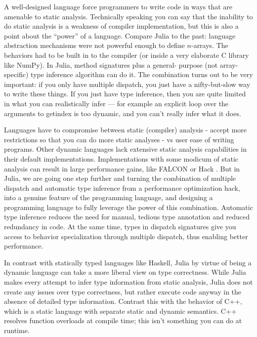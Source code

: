 \documentclass[preprint]{sigplanconf}
\begin{document}
A well-designed language force programmers to write code in ways that are
amenable to static analysis. Technically speaking you can say that the
inability to do static analysis is a weakness of compiler implementation, but
this is also a point about the ``power'' of a language. Compare Julia to the
past: language abstraction mechanisms were not powerful enough to define
$n$-arrays. The behaviors had to be built in to the compiler (or inside a very
elaborate C library like NumPy). In Julia, method signatures plus a general-
purpose (not array-specific) type inference algorithm can do it. The
combination turns out to be very important: if you only have multiple
dispatch, you just have a nifty-but-slow way to write these things. If you
just have type inference, then you are quite limited in what you can
realistically infer --- for example an explicit loop over the arguments to
getindex is too dynamic, and you can't really infer what it does.

Languages have to compromise between static (compiler) analysis - accept more
restrictions so that you can do more static analyses - vs user ease of writing
programs. Other dynamic languages lack extensive static analysis capabilities
in their default implementations. Implementations with some modicum of static
analysis can result in large performance gains, like FALCON or Hack
\cite{Verlaguet:2014hn}. But in Julia, we are going one step further and
turning the combination of multiple dispatch and automatic type inference from
a performance optimization hack, into a genuine feature of the programming
language, and designing a programming language to fully leverage the power of
this combination. Automatic type inference reduces the need for manual,
tedious type annotation and reduced redundancy in code. At the same time,
types in dispatch signatures give you access to behavior specialization through
multiple dispatch, thus enabling better performance. 

In contrast with statically typed languages like Haskell, Julia by virtue of
being a dynamic language can take a more liberal view on type correctness.
While Julia makes every attempt to infer type information from static
analysis, Julia does not create any issues over type correctness, but rather
execute code anyway in the absence of detailed type information. Contrast this
with the behavior of C++, which is a static language with separate static and
dynamic semantics. C++ resolves function overloads at compile time; this isn't
something you can do at runtime.
\end{document}
